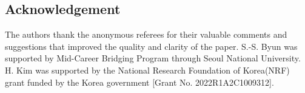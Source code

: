 \documentclass[reqno]{amsart}
\theoremstyle{plain}
\theoremstyle{definition}
\theoremstyle{remark}
\numberwithin{equation}{section}
\begin{document}
\subsection*{Acknowledgement}
The authors thank the anonymous referees for their valuable comments and suggestions that improved the quality and clarity of the paper. 
S.-S. Byun was supported by Mid-Career Bridging
Program through Seoul National University.
H. Kim was supported by the National Research Foundation of Korea(NRF) grant funded by the Korea government [Grant No. 2022R1A2C1009312].




\end{document}
